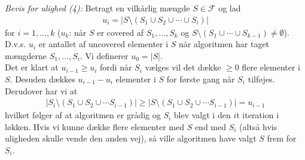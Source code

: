 \textit{Bevis for ulighed (4):} Betragt en vilkårlig mængde $S \in \mathcal{F}$ og lad 
\begin{align*}
	u_i=|S \setminus (S_1 \cup S_2 \cup \cdots \cup S_i)|
\end{align*} 
for $i=1,\ldots,k$ ($u_k$: når $S$ er covered af $S_1,\ldots,S_k$ og $S \setminus (S_1 \cup \cdots \cup S_{k-1}) \ne \emptyset$). D.v.s. $u_i$ er antallet af uncovered elementer i $S$ når algoritmen har taget mængderne $S_1,\ldots, S_i$.  Vi definerer $u_0=|S|$. \\

Det er klart at $u_{i-1} \ge u_i$ fordi når $S_i$ vælges vil det dække $\ge 0$ flere elementer i $S$. Desuden dækkes $u_{i-1}-u_i$ elementer i $S$ for første gang når $S_i$ tilføjes.\\

Derudover har vi at
\begin{align}
	|S_i \setminus (S_1 \cup S_2 \cup \cdots S_{i-1})| \ge |S \setminus (S_1 \cup S_2 \cup \cdots S_{i-1})| = u_{i-1}
\end{align}   
hvilket følger af at algoritmen er grådig og $S_i$ blev valgt i den $i$t iteration i løkken. Hvis vi kunne dække flere elementer med $S$ end med $S_i$ (altså hvis uligheden skulle vende den anden vej), så ville algoritmen have valgt $S$ frem for $S_i$. \\

